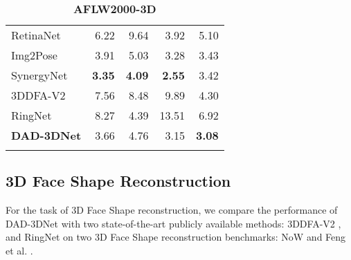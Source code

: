 \documentclass[10pt,twocolumn,letterpaper]{article}
\begin{document}
\begin{table}[t]
\begin{subtable}[t]{.99\linewidth}
{\begin{adjustbox}{width=0.99\textwidth}
\begin{tabular}{@{}lrrrr@{}}
RetinaNet\cite{RetinaFace} & 6.22 & 9.64 & 3.92 & 5.10\\
Img2Pose\cite{img2pose} & 3.91 & 5.03 & 3.28 & 3.43\\
SynergyNet\cite{wu2021synergy} & \textbf{3.35} & \textbf{4.09} & \textbf{2.55} & 3.42\\
3DDFA-V2\cite{3ddfa_cleardusk, guo2020towards} & 7.56 & 8.48 & 9.89 & 4.30\\
RingNet\cite{RingNet} & 8.27 & 4.39 & 13.51 & 6.92\\
\textbf{DAD-3DNet} & 3.66 & 4.76 & 3.15 & \textbf{3.08}\\\bottomrule \noalign{\smallskip}
\end{tabular}
\end{adjustbox}
\caption{\textbf{AFLW2000-3D}\cite{AFLW2000-3D}}
\label{t:3dpose_aflw} }	
	\end{subtable}
\vspace{-2.0em}
\label{t:3dpose}
\end{table}
\hspace{2em} 

\subsection{3D Face Shape Reconstruction}\label{ssec:3d_head_shape_reconstruction}
For the task of 3D Face Shape reconstruction, we compare the performance of DAD-3DNet with two state-of-the-art publicly available methods: 3DDFA-V2 \cite{3ddfa_cleardusk, guo2020towards},  and RingNet \cite{RingNet} on two 3D Face Shape reconstruction benchmarks: NoW \cite{RingNet} and Feng et al. \cite{3d-face-modeling-from-diverse-raw-scan-data}.
\end{document}
